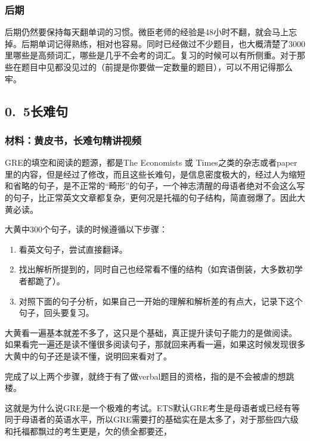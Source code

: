 \documentclass[11pt,a4paper]{article}
\begin{document}
{{{			\subsubsection*{后期}
				后期仍然要保持每天翻单词的习惯。微臣老师的经验是48小时不翻，就会马上忘掉。后期单词记得熟练，相对也容易。同时已经做过不少题目，也大概清楚了3000里哪些是高频词汇，哪些是几乎不会考的词汇。复习的时候可以有所侧重。对于那些在题目中见都没见过的（前提是你要做一定数量的题目），可以不用记得那么牢。
		}
		\subsection*{0.~5长难句}{
			\subsubsection*{材料：黄皮书，长难句精讲视频}
			
			GRE的填空和阅读的题源，都是The Economists 或 Times之类的杂志或者paper里的内容，但是经过了修改，而且这些长难句，是信息密度极大的，经过人为缩短和省略的句子，是不正常的“畸形”的句子，一个神志清醒的母语者绝对不会这么写的句子，比正常英文文章都复杂，更何况是托福的句子结构，简直弱爆了。因此大黄必读。
			
			
			\vspace{11pt}
			大黄中300个句子，读的时候遵循以下步骤：
			\begin{enumerate}
				\item 看英文句子，尝试直接翻译。
				\item 找出解析所提到的，同时自己也经常看不懂的结构（如宾语倒装，大多数初学者都跪了）。
				\item 对照下面的句子分析，如果自己一开始的理解和解析差的有点大，记录下这个句子，回头要复习。				
			\end{enumerate}
		
			大黄看一遍基本就差不多了，这只是个基础，真正提升读句子能力的是做阅读。
			如果看完一遍还是读不懂很多阅读句子，那就回来再看一遍，如果这时候发现很多大黄中的句子还是读不懂，说明回来看对了。			
			
			完成了以上两个步骤，就终于有了做verbal题目的资格，指的是不会被虐的想跳楼。
			
			这就是为什么说GRE是一个极难的考试。ETS默认GRE考生是母语者或已经有等同于母语者的英语水平，所以GRE需要打的基础实在是太多了，对于那些四六级和托福都飘过的考生更是，欠的债全都要还，
			
}}}
\end{document}
